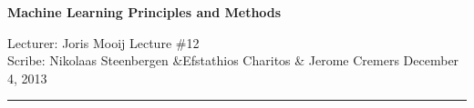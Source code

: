 \documentclass[11pt]{article}
\begin{document}
\thispagestyle{empty}

\vspace{-0.7in}

\begin{center}
\bf\large Machine Learning Principles and Methods
\end{center}

\noindent
Lecturer:  Joris Mooij  %
\hfill
Lecture \#12               %
\\
Scribe: Nikolaas Steenbergen \&Efstathios Charitos \& Jerome Cremers                %
\hfill
December 4, 2013                        %

\noindent
\rule{\textwidth}{1pt}

\medskip

\end{document}
